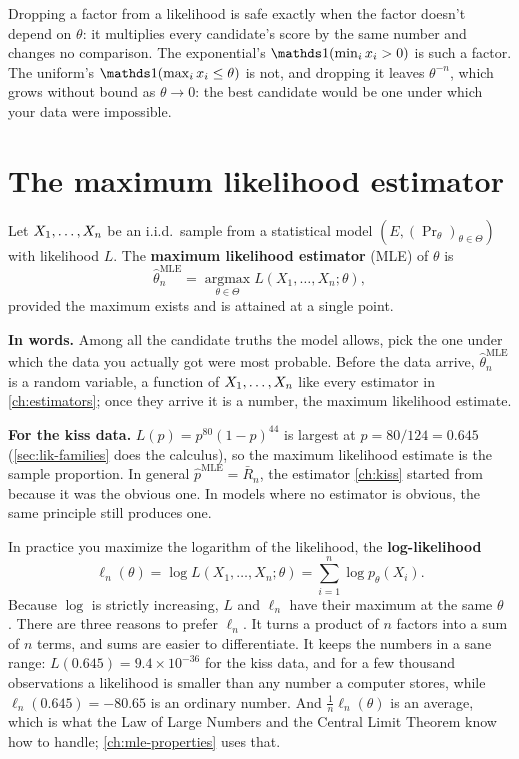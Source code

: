 \begin{pitfall}
Dropping a factor from a likelihood is safe exactly when the factor doesn't depend on $\theta$: it multiplies every candidate's score by the same number and changes no comparison.
The exponential's $\ind(\min_i x_i > 0)$ is such a factor.
The uniform's $\ind(\max_i x_i \leq \theta)$ is not, and dropping it leaves $\theta^{-n}$, which grows without bound as $\theta \to 0$: the best candidate would be one under which your data were impossible.
\end{pitfall}

\section{The maximum likelihood estimator}
\label{sec:lik-mle}

\begin{definition}
\label{def:mle}
Let $X_1, \ldots, X_n$ be an i.i.d.\ sample from a statistical model $(E, (\Pr_\theta)_{\theta \in \Theta})$ with likelihood $L$.
The \textbf{maximum likelihood estimator} (MLE) of $\theta$ is
\[
\hat{\theta}_n^{\text{MLE}} = \operatorname*{argmax}_{\theta \in \Theta} L(X_1, \ldots, X_n; \theta),
\]
provided the maximum exists and is attained at a single point.
\end{definition}

\begin{inwords}
\textbf{In words.} Among all the candidate truths the model allows, pick the one under which the data you actually got were most probable. Before the data arrive, $\hat{\theta}_n^{\text{MLE}}$ is a random variable, a function of $X_1, \ldots, X_n$ like every estimator in \cref{ch:estimators}; once they arrive it is a number, the maximum likelihood estimate.
\par\smallskip
\textbf{For the kiss data.} $L(p) = p^{80}(1 - p)^{44}$ is largest at $p = 80/124 = 0.645$ (\cref{sec:lik-families} does the calculus), so the maximum likelihood estimate is the sample proportion. In general $\hat{p}^{\text{MLE}} = \bar{R}_n$, the estimator \cref{ch:kiss} started from because it was the obvious one. In models where no estimator is obvious, the same principle still produces one.
\end{inwords}

In practice you maximize the logarithm of the likelihood, the \textbf{log-likelihood}
\[
\ell_n(\theta) = \log L(X_1, \ldots, X_n; \theta) = \sum_{i=1}^n \log p_\theta(X_i).
\]
Because $\log$ is strictly increasing, $L$ and $\ell_n$ have their maximum at the same $\theta$ .
There are three reasons to prefer $\ell_n$.
It turns a product of $n$ factors into a sum of $n$ terms, and sums are easier to differentiate.
It keeps the numbers in a sane range: $L(0.645) = 9.4 \times 10^{-36}$ for the kiss data, and for a few thousand observations a likelihood is smaller than any number a computer stores, while $\ell_n(0.645) = -80.65$ is an ordinary number.
And $\frac1n\ell_n(\theta)$ is an average, which is what the Law of Large Numbers and the Central Limit Theorem know how to handle; \cref{ch:mle-properties} uses that.

